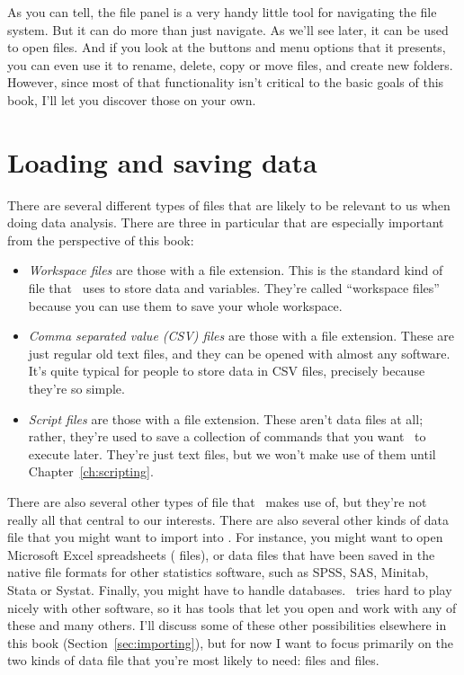 As you can tell, the file panel is a very handy little tool for navigating the file system. But it can do more than just navigate. As we'll see later, it can be used to open files. And if you look at the buttons and menu options that it presents, you can even use it to rename, delete, copy or move files, and create new folders. However, since most of that functionality isn't critical to the basic goals of this book, I'll let you discover those on your own.



\section{Loading and saving data\label{sec:load}}


There are several different types of files that are likely to be relevant to us when doing data analysis. There are three in particular that are especially important from the perspective of this book:
\begin{itemize}
\item {\it Workspace files} are those with a  file extension. This is the standard kind of file that \R\ uses to store data and variables. They're called ``workspace files'' because you can use them to save your whole workspace. 
\item {\it Comma separated value (CSV) files} are those with a  file extension. These are just regular old text files, and they can be opened with almost any software. It's quite typical for people to store data in CSV files, precisely because they're so simple.
\item {\it Script files} are those with a  file extension. These aren't data files at all; rather, they're used to save a collection of commands that you want \R\ to execute later. They're just text files, but we won't make use of them until Chapter~\ref{ch:scripting}.
\end{itemize} 
There are also several other types of file that \R\ makes use of, but they're not really all that central to our interests. There are also several other kinds of data file that you might want to import into \R. For instance, you might want to open  Microsoft Excel spreadsheets ( files), or data files that have been saved in the native file formats for other statistics software, such as SPSS, SAS, Minitab, Stata or Systat.  Finally, you might have to handle databases. \R\ tries hard to play nicely with other software, so it has tools that let you open and work with any of these and many others. I'll discuss some of these other possibilities elsewhere in this book (Section~\ref{sec:importing}), but for now I want to focus primarily on the two kinds of data file that you're most likely to need:  files and  files.
